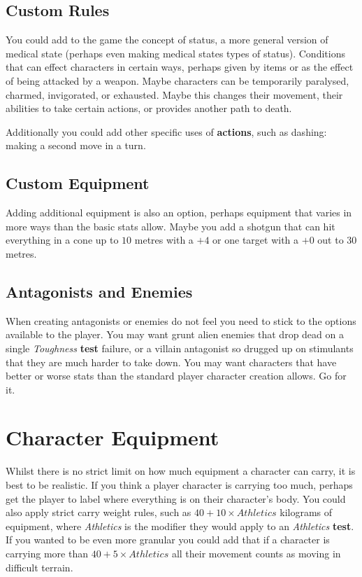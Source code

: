 \documentclass[11pt]{article}
\begin{document}
\begin{multicols}{3}
  \subsection*{Custom Rules}

  You could add to the game the concept of status, a more general version of medical state (perhaps even making medical states types of status). Conditions that can effect characters in certain ways, perhaps given by items or as the effect of being attacked by a weapon. Maybe characters can be temporarily paralysed, charmed, invigorated, or exhausted. Maybe this changes their movement, their abilities to take certain actions, or provides another path to death.

  Additionally you could add other specific uses of \textbf{actions}, such as dashing: making a second move in a turn.

  \subsection*{Custom Equipment}

  Adding additional equipment is also an option, perhaps equipment that varies in more ways than the basic stats allow. Maybe you add a shotgun that can hit everything in a cone up to $10$ metres with a $+4$ or one target with a $+0$ out to $30$ metres.

  \subsection*{Antagonists and Enemies}

  When creating antagonists or enemies do not feel you need to stick to the options available to the player. You may want grunt alien enemies that drop dead on a single \textit{Toughness} \textbf{test} failure, or a villain antagonist so drugged up on stimulants that they are much harder to take down. You may want characters that have better or worse stats than the standard player character creation allows. Go for it.

  \section*{Character Equipment}

  Whilst there is no strict limit on how much equipment a character can carry, it is best to be realistic. If you think a player character is carrying too much, perhaps get the player to label where everything is on their character's body. You could also apply strict carry weight rules, such as $40 + 10 \times Athletics$ kilograms of equipment, where \textit{Athletics} is the modifier they would apply to an \textit{Athletics} \textbf{test}. If you wanted to be even more granular you could add that if a character is carrying more than $40 + 5 \times Athletics$ all their movement counts as moving in difficult terrain.

\end{multicols}
\end{document}
